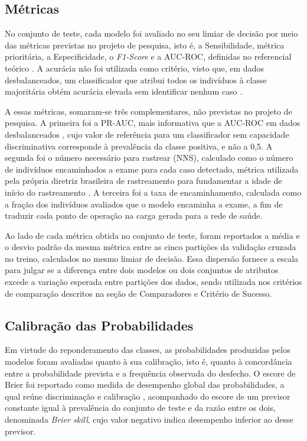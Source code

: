 \subsection{Métricas}\label{sec:metricas}
No conjunto de teste, cada modelo foi avaliado no seu limiar de decisão por meio das métricas previstas no projeto de pesquisa, isto é, a Sensibilidade, métrica prioritária, a Especificidade, o \textit{F1-Score} e a AUC-ROC, definidas no referencial teórico \cite{Swaminathan2024, fawcett2006introduction}. A acurácia não foi utilizada como critério, visto que, em dados desbalanceados, um classificador que atribui todos os indivíduos à classe majoritária obtém acurácia elevada sem identificar nenhum caso \cite{Swaminathan2024}.

A essas métricas, somaram-se três complementares, não previstas no projeto de pesquisa. A primeira foi a PR-AUC, mais informativa que a AUC-ROC em dados desbalanceados \cite{Swaminathan2024, saito2015precision}, cujo valor de referência para um classificador sem capacidade discriminativa corresponde à prevalência da classe positiva, e não a 0,5. A segunda foi o número necessário para rastrear (NNS), calculado como o número de indivíduos encaminhados a exame para cada caso detectado, métrica utilizada pela própria diretriz brasileira de rastreamento para fundamentar a idade de início do rastreamento \cite{Rodacki2025}. A terceira foi a taxa de encaminhamento, calculada como a fração dos indivíduos avaliados que o modelo encaminha a exame, a fim de traduzir cada ponto de operação na carga gerada para a rede de saúde.

Ao lado de cada métrica obtida no conjunto de teste, foram reportados a média e o desvio padrão da mesma métrica entre as cinco partições da validação cruzada no treino, calculados no mesmo limiar de decisão. Essa dispersão fornece a escala para julgar se a diferença entre dois modelos ou dois conjuntos de atributos excede a variação esperada entre partições dos dados, sendo utilizada nos critérios de comparação descritos na seção de Comparadores e Critério de Sucesso.

\subsection{Calibração das Probabilidades}\label{sec:calibracao}
Em virtude do reponderamento das classes, as probabilidades produzidas pelos modelos foram avaliadas quanto à sua calibração, isto é, quanto à concordância entre a probabilidade prevista e a frequência observada do desfecho. O escore de Brier foi reportado como medida de desempenho global das probabilidades, a qual reúne discriminação e calibração \cite{vandengoorbergh2022harm}, acompanhado do escore de um previsor constante igual à prevalência do conjunto de teste e da razão entre os dois, denominada \textit{Brier skill}, cujo valor negativo indica desempenho inferior ao desse previsor.

